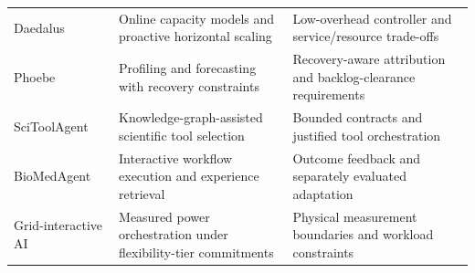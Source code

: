 \begin{table}[t]
\begin{tabularx}{\textwidth}{@{}p{} >{\raggedright\arraybackslash}X >{\raggedright\arraybackslash}X@{}}
Daedalus~\cite{pfister2024daedalus} & Online capacity models and proactive horizontal scaling & Low-overhead controller and service/resource trade-offs \\
Phoebe~\cite{geldenhuys2022phoebe} & Profiling and forecasting with recovery constraints & Recovery-aware attribution and backlog-clearance requirements \\
SciToolAgent~\cite{ding2025scitoolagent} & Knowledge-graph-assisted scientific tool selection & Bounded contracts and justified tool orchestration \\
BioMedAgent~\cite{bu2026biomedagent} & Interactive workflow execution and experience retrieval & Outcome feedback and separately evaluated adaptation \\
Grid-interactive AI~\cite{colangelo2026grid} & Measured power orchestration under flexibility-tier commitments & Physical measurement boundaries and workload constraints \\
\bottomrule
\end{tabularx}
\end{table}


